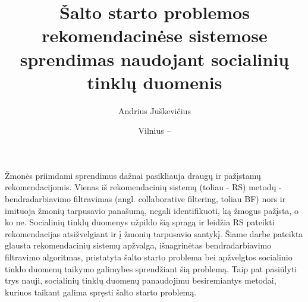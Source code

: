 \documentclass{VUMIFInfMagistrinis}
\title{Šalto starto problemos rekomendacinėse sistemose sprendimas naudojant socialinių tinklų duomenis}
\author{Andrius Juškevičius}
\date{Vilnius – \the\year}
\begin{document}
\maketitle


Žmonės priimdami sprendimus dažnai pasikliauja draugų ir pažįstamų rekomendacijomis. Vienas iš rekomendacinių sistemų (toliau - RS) metodų - bendradarbiavimo filtravimas (angl. collaborative filtering, toliau BF) nors ir imituoja žmonių tarpusavio panašumą, negali identifikuoti, ką žmogus pažįsta, o ko ne. Socialinių tinklų duomenys užpildo šią spragą ir leidžia RS pateikti rekomendacijas atsižvelgiant ir į žmonių tarpusavio santykį. 
\newline
\indent
Šiame darbe pateikta glausta rekomendacinių sistemų apžvalga, išnagrinėtas bendradarbiavimo filtravimo algoritmas, pristatyta šalto starto problema bei apžvelgtos socialinio tinklo duomenų taikymo galimybes sprendžiant šią problemą. Taip pat pasiūlyti trys nauji, socialinių tinklų duomenų panaudojimu besiremiantys metodai, kuriuos taikant galima spręsti šalto starto problemą.

\tableofcontents
\end{document}
